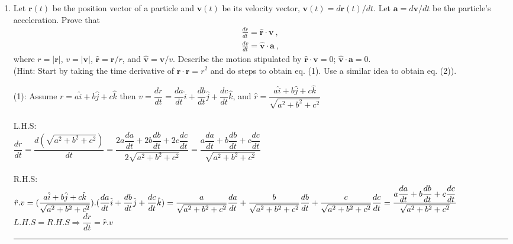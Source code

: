\documentclass[fleqn]{article}
\begin{document}
  \begin{enumerate}
    \item Let $\mathbf{r}(t)$ be the position vector of a particle and $\mathbf{v}(t)$ be its velocity vector, $\mathbf{v}(t) = d\mathbf{r}(t)/dt$. Let $\mathbf{a} = d\mathbf{v}/dt$ be the particle's acceleration. Prove that
      \begin{eqnarray}
      \frac{dr}{dt}=\mathbf{\hat{r}}\cdot \mathbf{v}~,  \\
      \frac{dv}{dt}=\mathbf{\hat{v}}\cdot \mathbf{a}~,  
      \end{eqnarray}
      where $r = |\mathbf{r}|$, $v = |\mathbf{v} |$, $\mathbf{\hat{r}}=\mathbf{r}/r$, and $\mathbf{\hat{v}}=\mathbf{v}/v$.   Describe the motion stipulated by $\mathbf{\hat{r}}\cdot \mathbf{v} = 0$; $\mathbf{\hat{v}}\cdot \mathbf{a}=0$.\\
      (Hint: Start by taking the time derivative of $\mathbf{r}\cdot \mathbf{r}=r^2$ and do steps to obtain eq. (1). Use a similar idea to obtain eq. (2)).

      \textcolor{hwColor}{
        (1): Assume $r=a \hat{i}+b \hat{j}+c \hat{k} $ then $ v=\dfrac{dr}{dt}=\dfrac{da}{dt}\hat{i}+\dfrac{db}{dt}\hat{j}+\dfrac{dc}{dt}\hat{k}$, and $\hat{r}=\dfrac{a \hat{i}+b \hat{j}+c \hat{k}}{\sqrt{a^2+b^2+c^2}}$ \\
        \\
        L.H.S: \\
        $
          \dfrac{dr}{dt}=\dfrac{d(\sqrt{a^2+b^2+c^2})}{dt}=\dfrac{2a\dfrac{da}{dt}+2b\dfrac{db}{dt}+2c\dfrac{dc}{dt}}{2\sqrt{a^2+b^2+c^2}}=\dfrac{a\dfrac{da}{dt}+b\dfrac{db}{dt}+c\dfrac{dc}{dt}}{\sqrt{a^2+b^2+c^2}}
        $
        \\
        \\
        R.H.S: \\
        $
          \hat{r}.v=(\dfrac{a \hat{i}+b \hat{j}+c \hat{k}}{\sqrt{a^2+b^2+c^2}}).(\dfrac{da}{dt}\hat{i}+\dfrac{db}{dt}\hat{j}+\dfrac{dc}{dt}\hat{k})=\dfrac{a}{\sqrt{a^2+b^2+c^2}}\dfrac{da}{dt}+\dfrac{b}{\sqrt{a^2+b^2+c^2}}\dfrac{db}{dt}+\dfrac{c}{\sqrt{a^2+b^2+c^2}}\dfrac{dc}{dt} \\
          \\
          =\dfrac{a\dfrac{da}{dt}+b\dfrac{db}{dt}+c\dfrac{dc}{dt}}{\sqrt{a^2+b^2+c^2}} \\
        $
        \\
        $L.H.S=R.H.S \Rightarrow \dfrac{dr}{dt}=\hat{r}.v$
      }

      \textcolor{hwColor}{
        \rule{15cm}{1pt}
      }


\end{enumerate}
\end{document}
